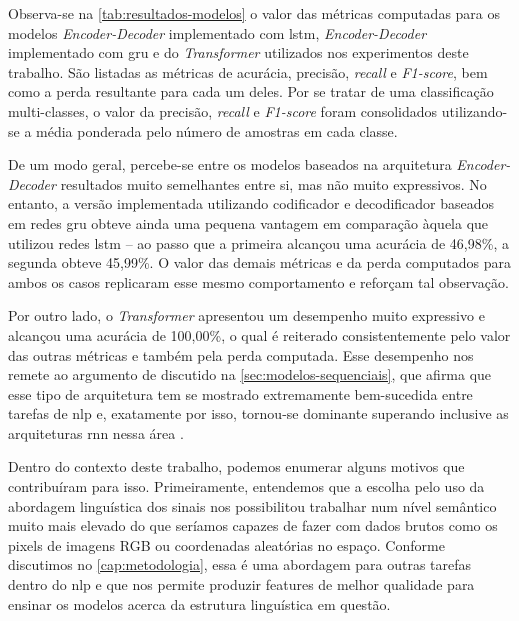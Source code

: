 
Observa-se na \autoref{tab:resultados-modelos} o valor das métricas computadas para os modelos \textit{Encoder-Decoder} implementado com \acrshort{lstm}, \textit{Encoder-Decoder} implementado com \acrshort{gru} e do \textit{Transformer} utilizados nos experimentos deste trabalho.
São listadas as métricas de acurácia, precisão, \textit{recall} e \textit{F1-score}, bem como a perda resultante para cada um deles. Por se tratar de uma classificação multi-classes, o valor da precisão, \textit{recall} e \textit{F1-score} foram consolidados utilizando-se a média ponderada pelo número de amostras em cada classe.


De um modo geral, percebe-se entre os modelos baseados na arquitetura \textit{Encoder-Decoder} resultados muito semelhantes entre si, mas não muito expressivos. 
No entanto, a versão implementada utilizando codificador e decodificador baseados em redes \acrshort{gru} obteve ainda uma pequena vantagem em comparação àquela que utilizou redes \acrshort{lstm} -- ao passo que a primeira alcançou uma acurácia de 46,98\%, a segunda obteve 45,99\%. 
O valor das demais métricas e da perda computados para ambos os casos replicaram esse mesmo comportamento e reforçam tal observação.

Por outro lado, o \textit{Transformer} apresentou um desempenho muito expressivo e alcançou uma acurácia de 100,00\%, o qual é reiterado consistentemente pelo valor das outras métricas e também pela perda computada.
Esse desempenho nos remete ao argumento de  discutido na \autoref{sec:modelos-sequenciais}, que afirma que esse tipo de arquitetura tem se mostrado extremamente bem-sucedida entre tarefas de \acrfull{nlp} e, exatamente por isso, tornou-se dominante superando inclusive as arquiteturas \acrshort{rnn}  nessa área .




Dentro do contexto deste trabalho, podemos enumerar alguns motivos que contribuíram para isso.
Primeiramente, entendemos que a escolha pelo uso da abordagem linguística dos sinais nos possibilitou trabalhar num nível semântico muito mais elevado do que seríamos capazes de fazer com dados brutos como os pixels de imagens RGB ou coordenadas aleatórias no espaço. Conforme discutimos no \autoref{cap:metodologia}, essa é uma abordagem para outras tarefas dentro do \acrshort{nlp} e que nos permite produzir features de melhor qualidade para ensinar os modelos acerca da estrutura linguística em questão. 


